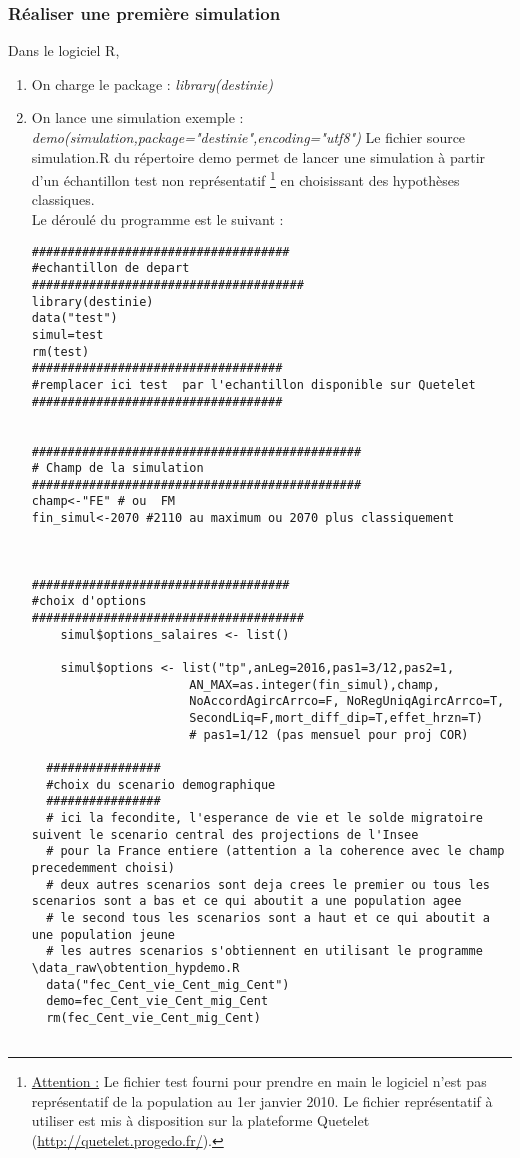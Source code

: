 \subsubsection{Réaliser une première simulation}
\label{subsec::simul}
Dans le logiciel R,
\begin{enumerate}
\item On charge le package : \textit{library(destinie)}
\item On lance une simulation exemple : \textit{demo(simulation,package="destinie",encoding="utf8")} Le fichier source simulation.R du répertoire demo permet de lancer une simulation à partir d'un échantillon test non représentatif \footnote{\underline{Attention :} Le fichier test fourni pour prendre en main le logiciel n'est pas représentatif de la population au 1er janvier 2010. Le fichier représentatif à utiliser est mis à disposition sur la plateforme Quetelet (\url{http://quetelet.progedo.fr/}).} en choisissant des hypothèses classiques.\\
Le déroulé du programme est le suivant :
\begin{lstlisting}
####################################
#echantillon de depart
######################################
library(destinie)
data("test")
simul=test
rm(test)
###################################
#remplacer ici test  par l'echantillon disponible sur Quetelet 
###################################


##############################################
# Champ de la simulation 
##############################################
champ<-"FE" # ou  FM
fin_simul<-2070 #2110 au maximum ou 2070 plus classiquement



####################################
#choix d'options
######################################
    simul$options_salaires <- list()    
    
    simul$options <- list("tp",anLeg=2016,pas1=3/12,pas2=1,
                      AN_MAX=as.integer(fin_simul),champ,
                      NoAccordAgircArrco=F, NoRegUniqAgircArrco=T, 
                      SecondLiq=F,mort_diff_dip=T,effet_hrzn=T) 
                      # pas1=1/12 (pas mensuel pour proj COR)

  ################
  #choix du scenario demographique 
  ################
  # ici la fecondite, l'esperance de vie et le solde migratoire suivent le scenario central des projections de l'Insee
  # pour la France entiere (attention a la coherence avec le champ precedemment choisi)
  # deux autres scenarios sont deja crees le premier ou tous les scenarios sont a bas et ce qui aboutit a une population agee
  # le second tous les scenarios sont a haut et ce qui aboutit a une population jeune    
  # les autres scenarios s'obtiennent en utilisant le programme \data_raw\obtention_hypdemo.R    
  data("fec_Cent_vie_Cent_mig_Cent")
  demo=fec_Cent_vie_Cent_mig_Cent
  rm(fec_Cent_vie_Cent_mig_Cent)


\end{lstlisting}
\end{enumerate}
